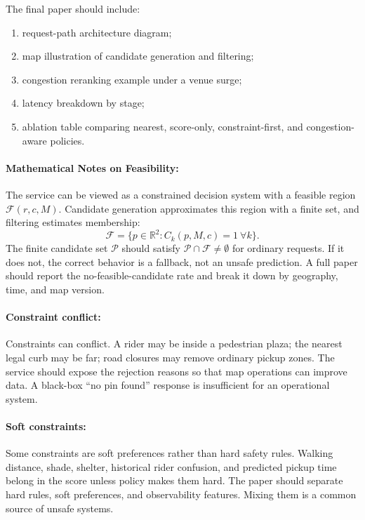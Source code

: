 \documentclass{article}
\begin{document}
The final paper should include:
\begin{enumerate}
  \item request-path architecture diagram;
  \item map illustration of candidate generation and filtering;
  \item congestion reranking example under a venue surge;
  \item latency breakdown by stage;
  \item ablation table comparing nearest, score-only, constraint-first, and congestion-aware policies.
\end{enumerate}

\paragraph{Mathematical Notes on Feasibility:}

The service can be viewed as a constrained decision system with a feasible region $\mathcal{F}(r,c,M)$. Candidate generation approximates this region with a finite set, and filtering estimates membership:
\begin{equation}
  \mathcal{F}=\{p\in\mathbb{R}^2:C_k(p,M,c)=1\ \forall k\}.
\end{equation}
The finite candidate set $\mathcal{P}$ should satisfy $\mathcal{P}\cap\mathcal{F}\neq\emptyset$ for ordinary requests. If it does not, the correct behavior is a fallback, not an unsafe prediction. A full paper should report the no-feasible-candidate rate and break it down by geography, time, and map version.

\paragraph{Constraint conflict:}

Constraints can conflict. A rider may be inside a pedestrian plaza; the nearest legal curb may be far; road closures may remove ordinary pickup zones. The service should expose the rejection reasons so that map operations can improve data. A black-box ``no pin found'' response is insufficient for an operational system.

\paragraph{Soft constraints:}

Some constraints are soft preferences rather than hard safety rules. Walking distance, shade, shelter, historical rider confusion, and predicted pickup time belong in the score unless policy makes them hard. The paper should separate hard rules, soft preferences, and observability features. Mixing them is a common source of unsafe systems.
\end{document}
